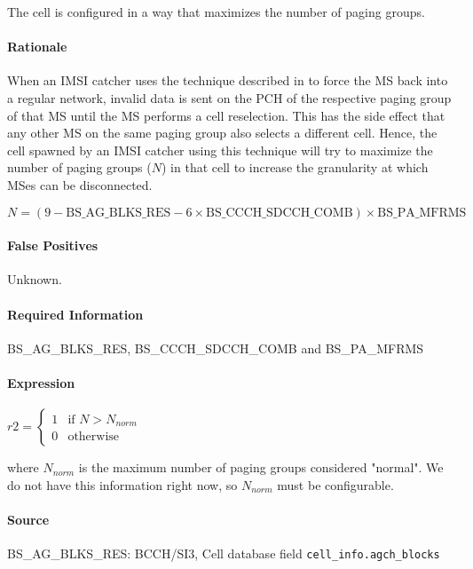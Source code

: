 \documentclass[a4paper,11pt,notitlepage,bigheadings,oneside]{scrartcl}
\begin{document}
The cell is configured in a way that maximizes the number of paging groups.

\paragraph{Rationale}

When an IMSI catcher uses the technique described in
\cite[0021]{bott2000verfahren} to force the MS back into a regular network,
invalid data is sent on the PCH of the respective paging group of that MS until
the MS performs a cell reselection. This has the side effect that any other MS
on the same paging group also selects a different cell. Hence, the cell spawned
by an IMSI catcher using this technique will try to maximize the number of
paging groups ($N$) in that cell to increase the granularity at which MSes can
be disconnected.

${N} = (9 - {\text{BS\_AG\_BLKS\_RES}} - 6\times {\text{BS\_CCCH\_SDCCH\_COMB}})\times {\text{BS\_PA\_MFRMS}}$

\paragraph{False Positives}

Unknown.

\paragraph{Required Information}

BS\_AG\_BLKS\_RES, BS\_CCCH\_SDCCH\_COMB and BS\_PA\_MFRMS

\paragraph{Expression}

$r2 =
\begin{cases}
	1 & \text{if } N > N_{norm} \\
        0 & \text{otherwise}
        \end{cases}
$

where $N_{norm}$ is the maximum number of paging groups considered "normal". We
do not have this information right now, so $N_{norm}$ must be configurable.

\paragraph{Source}

BS\_AG\_BLKS\_RES: BCCH/SI3, Cell database field \verb|cell_info.agch_blocks|
\end{document}
